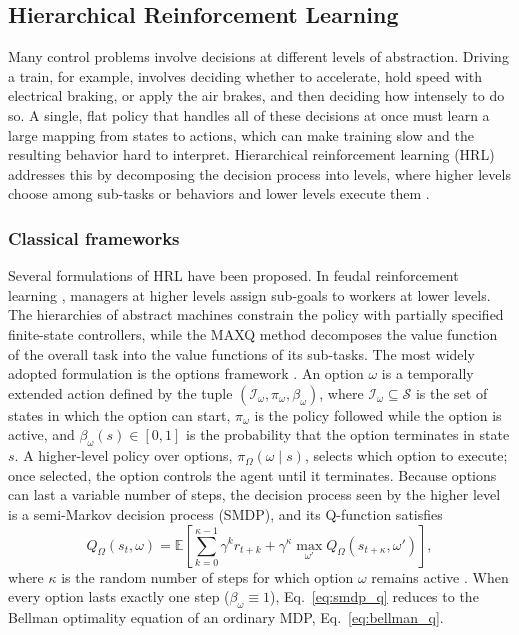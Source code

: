 \documentclass[preprint,10pt]{elsarticle}
\begin{document}
\subsection{Hierarchical Reinforcement Learning}
\label{sec:hrl}

Many control problems involve decisions at different levels of abstraction. Driving a train, for example, involves deciding whether to accelerate, hold speed with electrical braking, or apply the air brakes, and then deciding how intensely to do so. A single, flat policy that handles all of these decisions at once must learn a large mapping from states to actions, which can make training slow and the resulting behavior hard to interpret. Hierarchical reinforcement learning (HRL) addresses this by decomposing the decision process into levels, where higher levels choose among sub-tasks or behaviors and lower levels execute them \citep{barto2003recent,pateria2021hierarchical}.

\subsubsection*{Classical frameworks}

Several formulations of HRL have been proposed. In feudal reinforcement learning \citep{dayan1993feudal}, managers at higher levels assign sub-goals to workers at lower levels. The hierarchies of abstract machines \citep{parr1998reinforcement} constrain the policy with partially specified finite-state controllers, while the MAXQ method \citep{dietterich2000hierarchical} decomposes the value function of the overall task into the value functions of its sub-tasks. The most widely adopted formulation is the options framework \citep{sutton1999between}. An option $\omega$ is a temporally extended action defined by the tuple $(\mathcal{I}_\omega, \pi_\omega, \beta_\omega)$, where $\mathcal{I}_\omega \subseteq \mathcal{S}$ is the set of states in which the option can start, $\pi_\omega$ is the policy followed while the option is active, and $\beta_\omega(s) \in [0, 1]$ is the probability that the option terminates in state $s$. A higher-level policy over options, $\pi_\Omega(\omega \mid s)$, selects which option to execute; once selected, the option controls the agent until it terminates. Because options can last a variable number of steps, the decision process seen by the higher level is a semi-Markov decision process (SMDP), and its Q-function satisfies
\begin{equation}
    Q_\Omega(s_t, \omega) = \mathbb{E}\left[ \sum_{k=0}^{\kappa - 1} \gamma^k r_{t+k} + \gamma^{\kappa} \max_{\omega'} Q_\Omega(s_{t+\kappa}, \omega') \right],
    \label{eq:smdp_q}
\end{equation}
where $\kappa$ is the random number of steps for which option $\omega$ remains active \citep{sutton1999between}. When every option lasts exactly one step ($\beta_\omega \equiv 1$), Eq.~\eqref{eq:smdp_q} reduces to the Bellman optimality equation of an ordinary MDP, Eq.~\eqref{eq:bellman_q}.
\end{document}
